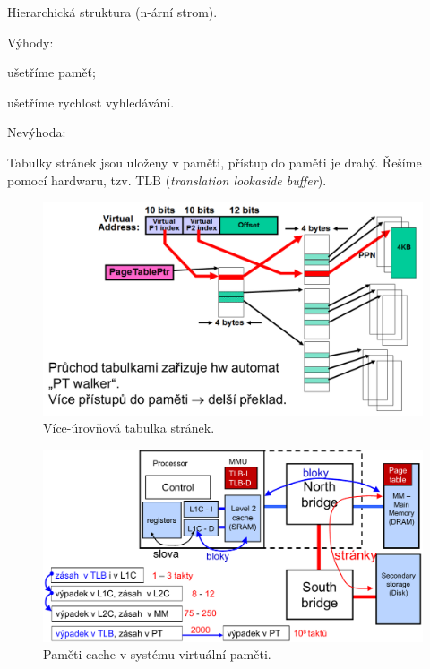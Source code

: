 \begin{compactitem}
    \item Hierarchická struktura (n-ární strom).
    \item Výhody: \begin{compactitem}
        \item ušetříme paměť;
        \item ušetříme rychlost vyhledávání.
    \end{compactitem}

    \item Nevýhoda: \begin{compactitem}
        \item Tabulky stránek jsou uloženy v paměti, přístup do paměti je drahý. Řešíme pomocí hardwaru, tzv. TLB (\textit{translation lookaside buffer}).
    \end{compactitem}

    \begin{figure}[H]
        \centering
        \includegraphics[width=1\linewidth]{viceurovnova_tabulka_stranek.pdf}
        \caption{Více-úrovňová tabulka stránek.}
    \end{figure}

    \begin{figure}[H]
        \centering
        \includegraphics[width=1\linewidth]{pameti_cache_v_systemu_virtualni_pameti.pdf}
        \caption{Paměti cache v systému virtuální paměti.}
    \end{figure}


\end{compactitem}
